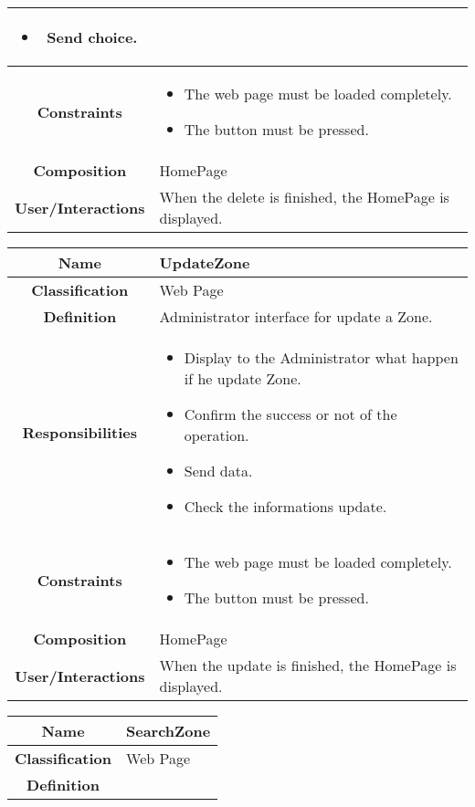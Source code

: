 \documentclass[11pt, a4paper,titlepage]{article}
\begin{document}
\begin{enumerate}
\begin{tabularx}{\textwidth}{| c | X |}
\begin{itemize}
		\item Send choice.
	\end{itemize}
	\\
	\hline
	\textbf{Constraints} &
	\begin{itemize}
		\item  The web page must be loaded completely.
		\item The button must be pressed.
	\end{itemize}
	\\
	\hline
	\textbf{Composition} & HomePage
	\\
	\hline
	\textbf{User/Interactions} &
	When the delete is finished, the HomePage is displayed.
	\\
	\hline 
\end{tabularx}
\begin{tabularx}{\textwidth}{| c | X |}
	\hline
	\textbf{Name} &
	UpdateZone
	\\
	\hline
	\textbf{Classification} &
	Web Page
	\\
	\hline
	\textbf{Definition} &
	Administrator interface for update a Zone.\\
	\hline
	\textbf{Responsibilities} &
	\begin{itemize}
		\item Display to the Administrator what happen if he update Zone.
		\item Confirm the success or not of the operation.
		\item Send data.
		\item Check the informations update.
	\end{itemize}
	\\
	\hline
	\textbf{Constraints} &
	\begin{itemize}
		\item  The web page must be loaded completely.
		\item The button must be pressed.
	\end{itemize}
	\\
	\hline
	\textbf{Composition} & HomePage
	\\
	\hline
	\textbf{User/Interactions} &
	When the update is finished, the HomePage is displayed.
	\\
	\hline 
\end{tabularx}
\begin{tabularx}{\textwidth}{| c | X |}
	\hline
	\textbf{Name} &
	SearchZone
	\\
	\hline
	\textbf{Classification} &
	Web Page
	\\
	\hline
	\textbf{Definition} &

\end{tabularx}
\end{enumerate}
\end{document}
